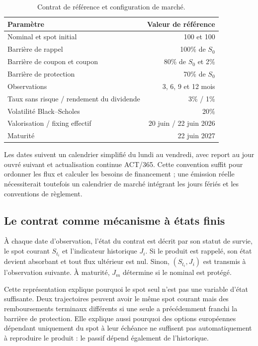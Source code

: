 \documentclass[12pt,a4paper]{article}
\newcommand{\1}{\mathbf{1}}
\begin{document}
\begin{table}[H]
\centering
\begin{tabular}{lr}
\toprule
Paramètre & Valeur de référence \\
\midrule
Nominal et spot initial & 100 et 100 \\
Barrière de rappel & 100\% de $S_0$ \\
Barrière de coupon et coupon & 80\% de $S_0$ et 2\% \\
Barrière de protection & 70\% de $S_0$ \\
Observations & 3, 6, 9 et 12 mois \\
Taux sans risque / rendement du dividende & 3\% / 1\% \\
Volatilité Black--Scholes & 20\% \\
Valorisation / fixing effectif & 20 juin / 22 juin 2026 \\
Maturité & 22 juin 2027 \\
\bottomrule
\end{tabular}
\caption{Contrat de référence et configuration de marché.}
\label{tab:contract}
\end{table}

Les dates suivent un calendrier simplifié du lundi au vendredi, avec report au
jour ouvré suivant et actualisation continue ACT/365. Cette convention suffit
pour ordonner les flux et calculer les besoins de financement ; une émission
réelle nécessiterait toutefois un calendrier de marché intégrant les jours
fériés et les conventions de règlement.

\subsection{Le contrat comme mécanisme à états finis}

À chaque date d'observation, l'état du contrat est décrit par son statut de
survie, le spot courant $S_{t_i}$ et l'indicateur historique $J_i$. Si le produit
est rappelé, son état devient absorbant et tout flux ultérieur est nul. Sinon,
$(S_{t_i},J_i)$ est transmis à l'observation suivante. À maturité, $J_m$
détermine si le nominal est protégé.

Cette représentation explique pourquoi le spot seul n'est pas une variable
d'état suffisante. Deux trajectoires peuvent avoir le même spot courant mais des
remboursements terminaux différents si une seule a précédemment franchi la
barrière de protection. Elle explique aussi pourquoi des options européennes
dépendant uniquement du spot à leur échéance ne suffisent pas automatiquement à
reproduire le produit : le passif dépend également de l'historique.
\end{document}
